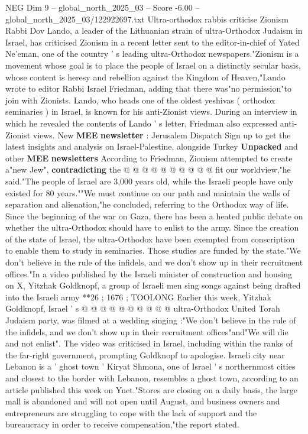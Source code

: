 \begin{textsample}{NEG Dim 9 – global\_north\_2025\_03 – Score -6.00 – global\_north\_2025\_03/122922697.txt}  \label{ex:f9_neg_066}
Ultra-orthodox rabbis criticise Zionism Rabbi Dov Lando, a leader of the Lithuanian strain of ultra-Orthodox Judaism in Israel, has criticised Zionism in a recent letter sent to the editor-in-chief of Yated Ne'eman, one of the country ' s leading ultra-Orthodox newspapers."Zionism is a movement whose goal is to place the people of Israel on a distinctly secular basis, whose content is heresy and rebellion against the Kingdom of Heaven,"Lando wrote to editor Rabbi Israel Friedman, adding that there was"no permission"to join with Zionists.
Lando, who heads one of the oldest yeshivas ( orthodox seminaries ) in Israel, is known for his anti-Zionist views.
During an interview in which he revealed the contents of Lando ' s letter, Friedman also expressed anti-Zionist views.
New \textbf{MEE} \textbf{newsletter} : Jerusalem Dispatch Sign up to get the latest insights and analysis on Israel-Palestine, alongside Turkey \textbf{Unpacked} and other \textbf{MEE} \textbf{newsletters} According to Friedman, Zionism attempted to create a"new Jew", \textbf{contradicting} the @ @ @ @ @ @ @ @ @ @ fit our worldview,"he said."The people of Israel are 3,000 years old, while the Israeli people have only existed for 80 years.""We must continue on our path and maintain the walls of separation and alienation,"he concluded, referring to the Orthodox way of life.
Since the beginning of the war on Gaza, there has been a heated public debate on whether the ultra-Orthodox should have to enlist to the army.
Since the creation of the state of Israel, the ultra-Orthodox have been exempted from conscription to enable them to study in seminaries.
Those studies are funded by the state."We don't believe in the rule of the infidels, and we don't show up in their recruitment offices."In a video published by the Israeli minister of construction and housing on X, Yitzhak Goldknopf, a group of Israeli men sing songs against being drafted into the Israeli army **26 ; 1676 ; TOOLONG Earlier this week, Yitzhak Goldknopf, Israel ' s @ @ @ @ @ @ @ @ @ @ ultra-Orthodox United Torah Judaism party, was filmed at a wedding singing :"We don't believe in the rule of the infidels, and we don't show up in their recruitment offices"and"We will die and not enlist".
The video was criticised in Israel, including within the ranks of the far-right government, prompting Goldknopf to apologise.
Israeli city near Lebanon is a ' ghost town ' Kiryat Shmona, one of Israel ' s northernmost cities and closest to the border with Lebanon, resembles a ghost town, according to an article published this week on Ynet."Stores are closing on a daily basis, the large mall is abandoned and will not open until August, and business owners and entrepreneurs are struggling to cope with the lack of support and the bureaucracy in order to receive compensation,"the report stated.

\end{textsample}
